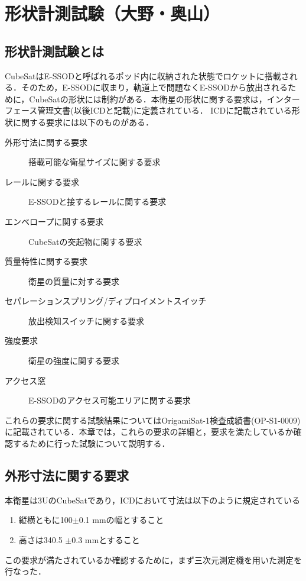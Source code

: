 \section{形状計測試験（大野・奥山）}
\label{chap:shapemeasurement}

\subsection{形状計測試験とは}

CubeSatはE-SSODと呼ばれるポッド内に収納された状態でロケットに搭載される．そのため，E-SSODに収まり，軌道上で問題なくE-SSODから放出されるために，CubeSatの形状には制約がある．本衛星の形状に関する要求は，インターフェース管理文書(以後ICDと記載)に定義されている．
ICDに記載されている形状に関する要求には以下のものがある．
\begin{description}
	\item[外形寸法に関する要求] 搭載可能な衛星サイズに関する要求
	\item[レールに関する要求] E-SSODと接するレールに関する要求
	\item[エンベロープに関する要求] CubeSatの突起物に関する要求
	\item[質量特性に関する要求] 衛星の質量に対する要求
	\item[セパレーションスプリング/ディプロイメントスイッチ] 放出検知スイッチに関する要求
	\item[強度要求] 衛星の強度に関する要求
	\item[アクセス窓] E-SSODのアクセス可能エリアに関する要求
\end{description}

これらの要求に関する試験結果についてはOrigamiSat-1検査成績書(OP-S1-0009)に記載されている．本章では，これらの要求の詳細と，要求を満たしているか確認するために行った試験について説明する．

\subsection{外形寸法に関する要求}

本衛星は3UのCubeSatであり，ICDにおいて寸法は以下のように規定されている

\begin{enumerate}
	\item 縦横ともに100$\pm$0.1 mmの幅とすること
	\item 高さは340.5 $\pm$0.3 mmとすること
\end{enumerate}

この要求が満たされているか確認するために，まず三次元測定機を用いた測定を行なった．

